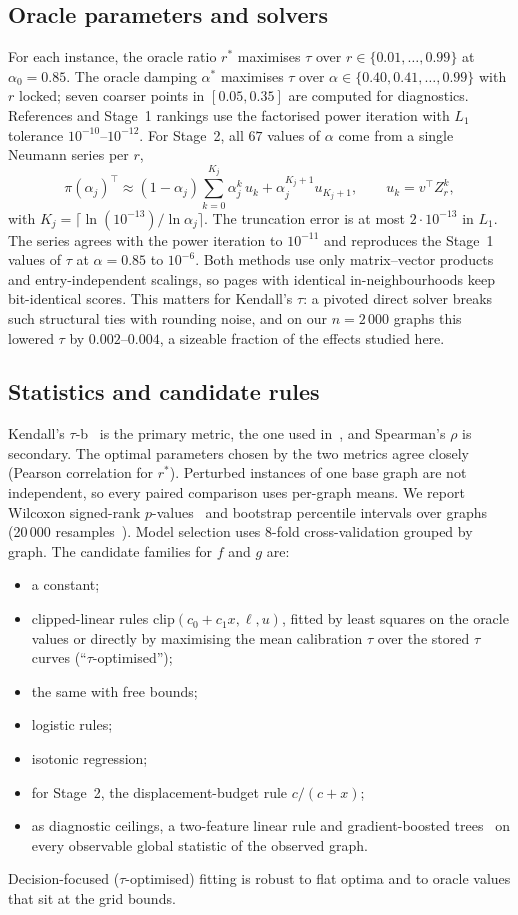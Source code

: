 \documentclass[11pt,a4paper]{article}
\theoremstyle{definition}
\theoremstyle{remark}
\newcommand{\clip}{\mathrm{clip}}
\begin{document}
\subsection{Oracle parameters and solvers}
For each instance, the oracle ratio $r^*$ maximises $\tau$ over $r\in\{0.01,\dots,0.99\}$ at
$\alpha_0=0.85$. The oracle damping $\alpha^*$ maximises $\tau$ over $\alpha\in\{0.40,0.41,\dots,0.99\}$
with $r$ locked; seven coarser points in $[0.05,0.35]$ are computed for diagnostics. References and
Stage~1 rankings use the factorised power iteration with $L_1$ tolerance $10^{-10}$--$10^{-12}$. For
Stage~2, all $67$ values of $\alpha$ come from a single Neumann series per $r$,
\[
\pi(\alpha_j)^\top\approx(1-\alpha_j)\sum_{k=0}^{K_j}\alpha_j^k\,u_k+\alpha_j^{K_j+1}u_{K_j+1},
\qquad u_k=v^\top Z_r^k,
\]
with $K_j=\lceil\ln(10^{-13})/\ln\alpha_j\rceil$. The truncation error is at most $2\cdot10^{-13}$ in
$L_1$. The series agrees with the power iteration to $10^{-11}$ and reproduces the Stage~1 values of
$\tau$ at $\alpha=0.85$ to $10^{-6}$. Both methods use only matrix--vector products and entry-independent
scalings, so pages with identical in-neighbourhoods keep bit-identical scores. This matters for
Kendall's $\tau$: a pivoted direct solver breaks such structural ties with rounding noise, and on our
$n=2\,000$ graphs this lowered $\tau$ by $0.002$--$0.004$, a sizeable fraction of the effects
studied here.

\subsection{Statistics and candidate rules}
Kendall's $\tau$-b~\cite{kendall38,kendall45} is the primary metric, the one used in~\cite{ng13}, and
Spearman's $\rho$ is secondary. The optimal parameters chosen by the two metrics agree closely (Pearson
correlation \SOneSpearmanKendall{} for $r^*$). Perturbed instances of one base graph are not
independent, so every paired comparison uses per-graph means. We report Wilcoxon signed-rank
$p$-values~\cite{wilcoxon45} and bootstrap percentile intervals over graphs (20\,000
resamples~\cite{efron93}). Model selection uses 8-fold cross-validation grouped by graph. The candidate
families for $f$ and $g$ are:
\begin{itemize}[leftmargin=1.4em,itemsep=0pt]
\item a constant;
\item clipped-linear rules $\clip(c_0+c_1x,\ell,u)$, fitted by least squares on the oracle values or
directly by maximising the mean calibration $\tau$ over the stored $\tau$ curves (``$\tau$-optimised'');
\item the same with free bounds;
\item logistic rules;
\item isotonic regression;
\item for Stage~2, the displacement-budget rule $c/(c+x)$;
\item as diagnostic ceilings, a two-feature linear rule and gradient-boosted trees~\cite{friedman01} on
every observable global statistic of the observed graph.
\end{itemize}
Decision-focused ($\tau$-optimised) fitting is robust to flat optima and to oracle values that sit at
the grid bounds.
\end{document}
